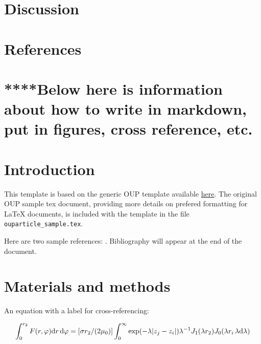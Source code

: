 \documentclass[12pt,halfline,a4paper,]{ouparticle}
\begin{document}
\hypertarget{discussion}{%
\section{Discussion}\label{discussion}}

\hypertarget{references}{%
\section{References}\label{references}}

\hypertarget{below-here-is-information-about-how-to-write-in-markdown-put-in-figures-cross-reference-etc.}{%
\section{****Below here is information about how to write in markdown,
put in figures, cross reference,
etc.}\label{below-here-is-information-about-how-to-write-in-markdown-put-in-figures-cross-reference-etc.}}

\hypertarget{introduction-1}{%
\section{Introduction}\label{introduction-1}}

This template is based on the generic OUP template available
\href{https://academic.oup.com/icesjms/pages/General_Instructions}{here}.
The original OUP sample tex document, providing more details on prefered
formatting for LaTeX documents, is included with the template in the
file \texttt{ouparticle\_sample.tex}.

Here are two sample references: \citeauthor{Feynman1963118}
\citetext{\citeyear{Feynman1963118}; \citealp{Dirac1953888}}.
Bibliography will appear at the end of the document.

\hypertarget{materials-and-methods-1}{%
\section{Materials and methods}\label{materials-and-methods-1}}

An equation with a label for cross-referencing:

\begin{equation}\label{eq:eq1}
\int^{r_2}_0 F(r,\varphi){\rm d}r\,{\rm d}\varphi = [\sigma r_2/(2\mu_0)]
\int^{\infty}_0\exp(-\lambda|z_j-z_i|)\lambda^{-1}J_1 (\lambda r_2)J_0
(\lambda r_i\,\lambda {\rm d}\lambda)
\end{equation}
\end{document}
